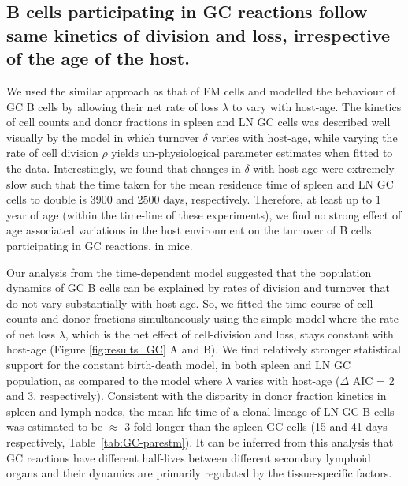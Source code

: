 \documentclass[11pt]{article}
\newcommand{\red}[1]{{\color{red}{#1}}}
\begin{document}
	\subsection*{B cells participating in GC reactions follow same kinetics of division and loss, irrespective of the age of the host.}
	We used the similar approach as that of FM cells and modelled the behaviour of \red{actively dividing and short-lived} GC B cells by allowing their net rate of loss $\lambda$ to vary with host-age. 
	The kinetics of cell counts and donor fractions in spleen and LN GC cells was described well visually by the model in which turnover $\delta$ varies with host-age, while varying the rate of cell division $\rho$ yields un-physiological parameter estimates when fitted to the data.
	Interestingly, we found that changes in $\delta$ with host age were extremely slow such that the time taken for the mean residence time of spleen and LN GC cells to double is 3900 and 2500 days, respectively.
	Therefore, at least up to 1 year of age (within the time-line of these experiments), we find no strong effect of age associated variations in the host environment on the turnover of B cells participating in GC reactions, in mice.
	
	
	Our analysis from the time-dependent model suggested that the population dynamics of GC B cells can be explained by rates of division and turnover that do not vary substantially with host age.
	So, we fitted the time-course of cell counts and donor fractions simultaneously using the simple model where the rate of net loss $\lambda$, which is the net effect of cell-division and loss, stays constant with host-age (Figure \ref{fig:results_GC} A and B).
	We find relatively stronger statistical support for the constant birth-death model, in both spleen and LN GC population, as compared to the model where $\lambda$ varies with host-age ($\Delta$ AIC = 2 and 3, respectively).
	Consistent with the disparity in donor fraction kinetics in spleen and lymph nodes, the mean life-time of a clonal lineage of LN GC B cells was estimated to be $\approx$ 3 fold longer than the spleen GC cells (15 and 41 days respectively, Table~\ref{tab:GC-parestm}).
	It can be inferred from this analysis that GC reactions have different half-lives between different secondary lymphoid organs and their dynamics are primarily regulated by the tissue-specific factors.
	
\end{document}
